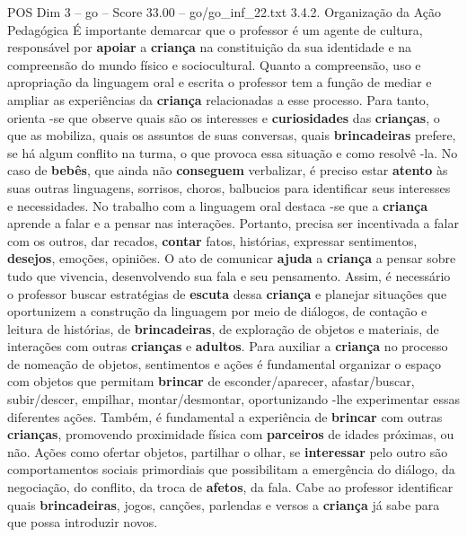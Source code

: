 \begin{textsample}{POS Dim 3 – go – Score 33.00 – go/go\_inf\_22.txt}  \label{ex:f3_pos_047}
3.4.2.
Organização da Ação Pedagógica É importante demarcar que o professor é um agente de cultura, responsável por \textbf{apoiar} a \textbf{criança} na constituição da sua identidade e na compreensão do mundo físico e sociocultural.
Quanto a compreensão, uso e apropriação da linguagem oral e escrita o professor tem a função de mediar e ampliar as experiências da \textbf{criança} relacionadas a esse processo.
Para tanto, orienta -se que observe quais são os interesses e \textbf{curiosidades} das \textbf{crianças}, o que as mobiliza, quais os assuntos de suas conversas, quais \textbf{brincadeiras} prefere, se há algum conflito na turma, o que provoca essa situação e como resolvê -la.
No caso de \textbf{bebês}, que ainda não \textbf{conseguem} verbalizar, é preciso estar \textbf{atento} às suas outras linguagens, sorrisos, choros, balbucios para identificar seus interesses e necessidades.
No trabalho com a linguagem oral destaca -se que a \textbf{criança} aprende a falar e a pensar nas interações.
Portanto, precisa ser incentivada a falar com os outros, dar recados, \textbf{contar} fatos, histórias, expressar sentimentos, \textbf{desejos}, emoções, opiniões.
O ato de comunicar \textbf{ajuda} a \textbf{criança} a pensar sobre tudo que vivencia, desenvolvendo sua fala e seu pensamento.
Assim, é necessário o professor buscar estratégias de \textbf{escuta} dessa \textbf{criança} e planejar situações que oportunizem a construção da linguagem por meio de diálogos, de contação e leitura de histórias, de \textbf{brincadeiras}, de exploração de objetos e materiais, de interações com outras \textbf{crianças} e \textbf{adultos}.
Para auxiliar a \textbf{criança} no processo de nomeação de objetos, sentimentos e ações é fundamental organizar o espaço com objetos que permitam \textbf{brincar} de esconder/aparecer, afastar/buscar, subir/descer, empilhar, montar/desmontar, oportunizando -lhe experimentar essas diferentes ações.
Também, é fundamental a experiência de \textbf{brincar} com outras \textbf{crianças}, promovendo proximidade física com \textbf{parceiros} de idades próximas, ou não.
Ações como ofertar objetos, partilhar o olhar, se \textbf{interessar} pelo outro são comportamentos sociais primordiais que possibilitam a emergência do diálogo, da negociação, do conflito, da troca de \textbf{afetos}, da fala.
Cabe ao professor identificar quais \textbf{brincadeiras}, jogos, canções, parlendas e versos a \textbf{criança} já sabe para que possa introduzir novos.

\end{textsample}
